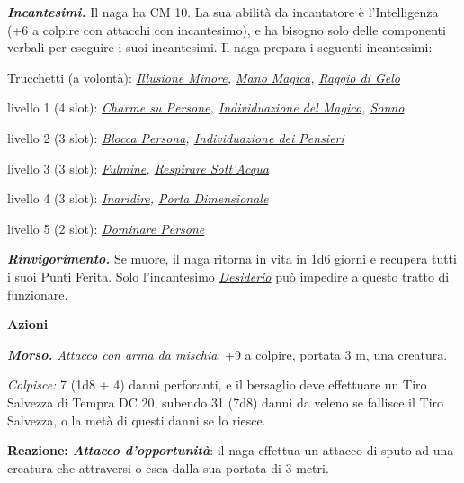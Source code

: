 \begin{multicols}{2}
{\emph{\textbf{Incantesimi.}} Il naga ha CM 10. La sua abilità da incantatore è l'Intelligenza (+6 a colpire con attacchi con incantesimo), e ha bisogno solo delle componenti verbali per eseguire i suoi incantesimi. Il naga prepara i seguenti incantesimi:

Trucchetti (a volontà): \emph{\hyperlink{Illusione Minore}{Illusione Minore}, \hyperlink{Mano Magica}{Mano Magica}, \hyperlink{Raggio di Gelo}{Raggio di Gelo}}

livello 1 (4 slot): \emph{\hyperlink{Charme su Persone}{Charme su Persone}, \hyperlink{Individuazione del Magico}{Individuazione del Magico}, \hyperlink{Sonno}{Sonno}}

livello 2 (3 slot): \emph{\hyperlink{Blocca Persona}{Blocca Persona}, \hyperlink{Individuazione dei Pensieri}{Individuazione dei Pensieri}}

livello 3 (3 slot): \emph{\hyperlink{Fulmine}{Fulmine}, \hyperlink{Respirare Sott'Acqua}{Respirare Sott'Acqua}}

livello 4 (3 slot): \emph{\hyperlink{Inaridire}{Inaridire}, \hyperlink{Porta Dimensionale}{Porta Dimensionale}}

livello 5 (2 slot): \emph{\hyperlink{Dominare Persone}{Dominare Persone}}

\emph{\textbf{Rinvigorimento.}} Se muore, il naga ritorna in vita in 1d6 giorni e recupera tutti i suoi Punti Ferita. Solo l'incantesimo \emph{\hyperlink{Desiderio}{Desiderio}} può impedire a questo tratto di funzionare.

\textbf{Azioni}

\emph{\textbf{Morso.} Attacco con arma da mischia}: +9 a colpire, portata 3 m, una creatura.

\emph{Colpisce:} 7 (1d8 + 4) danni perforanti, e il bersaglio deve effettuare un Tiro Salvezza di Tempra DC 20, subendo 31 (7d8) danni da veleno se fallisce il Tiro Salvezza, o la metà di questi danni se lo riesce.

\textbf{Reazione: \emph{Attacco d'opportunità}}: il naga effettua un attacco di sputo ad una creatura che attraversi o esca dalla sua portata di 3 metri.

}
\end{multicols}
